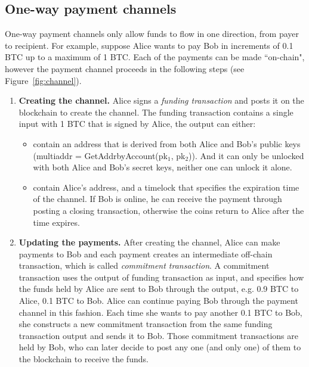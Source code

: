 \documentclass{article}
\newcommand{\pramod}[1]{{\color{red}
\footnotesize[Pramod: #1] }}
\begin{document}
\subsection*{One-way payment channels}
One-way payment channels  only allow funds to flow in one direction, from payer to recipient. For example, suppose Alice wants to pay Bob in increments of 0.1 BTC up to a maximum of 1 BTC. Each of the payments can be made ``on-chain", however the payment channel proceeds in the following steps (see Figure~\ref{fig:channel}). 
\begin{enumerate}
    \item \textbf{Creating the channel.} Alice signs a {\em funding transaction} and posts it on the blockchain to create the channel. The funding transaction contains a single input with 1 BTC that is signed by Alice, the output can either: 
    \begin{itemize}
        \item contain an address that is derived from both Alice and Bob's public keys (\textsf{multiaddr = GetAddrbyAccount(pk$_1$, pk$_2$)}). And it can only be unlocked with both Alice and Bob's secret keys, neither one can unlock it alone. 
        \item contain Alice's address, and a timelock that specifies the expiration time of the channel.  %
        If Bob is online, he can receive the payment through posting a closing transaction, otherwise the coins return to Alice after the time expires. 
    \end{itemize}
    \item \textbf{Updating the payments.} After creating the channel, Alice can make payments to Bob and each payment creates an intermediate off-chain transaction, which is called {\em commitment transaction}. A commitment transaction uses the output of funding transaction as input, and specifies how the funds held by Alice are sent to Bob through the output, e.g. 0.9 BTC to Alice, 0.1 BTC to Bob. Alice can continue paying Bob through the payment channel in this fashion. Each time she wants to pay another 0.1 BTC to Bob, she constructs a new commitment transaction from the same funding transaction output and sends it to Bob. Those commitment transactions are held by Bob, who can later decide to post any one (and only one) of them to the blockchain to receive the funds.

\end{enumerate}
\end{document}
